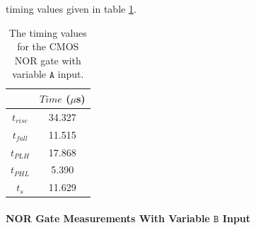 \documentclass[titlepage, 12pt]{article}
\newcommand\sA{\ensuremath{\mathtt{A}}}
\begin{document}
    timing values given in table \ref{tab:NOR_A_time}.
    \begin{table}[H]
        \centering
        \caption{The timing values for the CMOS NOR gate with variable
        $\sA$ input.}
        \label{tab:NOR_A_time}
        \begin{tabular}{c|c}
            & $Time$ ($\mu$s)\\
            \hline
            $t_{rise}$ & 34.327\\
            $t_{fall}$ & 11.515\\
            $t_{PLH}$ & 17.868\\
            $t_{PHL}$ & 5.390\\
            $t_s$ & 11.629\\
        \end{tabular}
    \end{table}
    \paragraph{NOR Gate Measurements With Variable $\mathtt{B}$
    Input}
\end{document}
